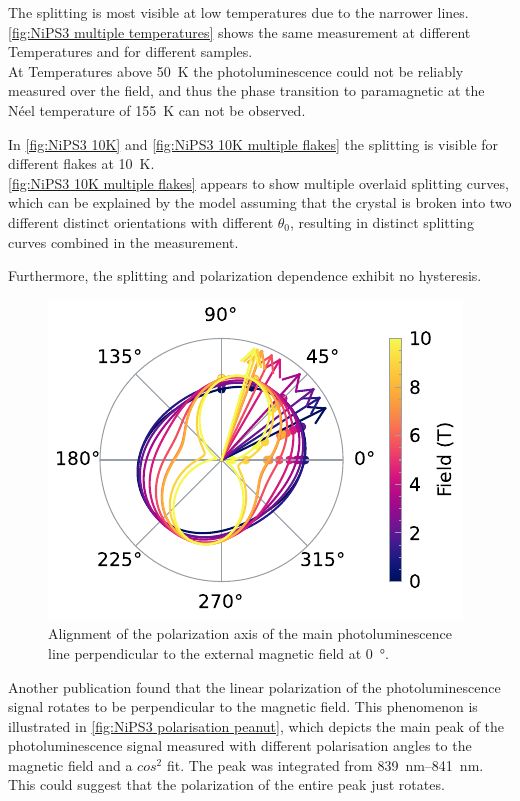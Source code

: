 \documentclass[
	oneside,
	parskip=half,
	a4paper,
]{scrbook}
\begin{document}
The splitting is most visible at low temperatures due to the narrower lines.
\autoref{fig:NiPS3 multiple temperatures} shows the same measurement at different Temperatures and for different samples.\\
At Temperatures above \SI{50}{K} the photoluminescence could not be reliably measured over the field, and thus the phase transition to paramagnetic at the Néel temperature of \SI{155}{K} \cite{MPS_magnetism} can not be observed.

In \autoref{fig:NiPS3 10K} and \autoref{fig:NiPS3 10K multiple flakes} the splitting is visible for different flakes at \SI{10}{K}.\\
\autoref{fig:NiPS3 10K multiple flakes} appears to show multiple overlaid splitting curves,
which can be explained by the model assuming that the crystal is broken into two different distinct orientations with different $\theta_0$, resulting in distinct splitting curves combined in the measurement.

Furthermore, the splitting and polarization dependence exhibit no hysteresis.


\begin{figure}
	\centering
	\includegraphics{../figures/2024-04-07 NiPS3 polarisation.pdf}
	\caption{Alignment of the polarization axis of the main photoluminescence line perpendicular to the external magnetic field at \SI{0}{\degree}.}
	\label{fig:NiPS3 polarisation peanut}
\end{figure}
Another publication \cite{NiPS3_linear} found that the linear polarization of the photoluminescence signal rotates to be perpendicular to the magnetic field. 
This phenomenon is illustrated in \autoref{fig:NiPS3 polarisation peanut}, which depicts the main peak of the photoluminescence signal measured with different polarisation angles to the magnetic field and a $cos^2$ fit. The peak was integrated from \SIrange{839}{841}{nm}.\\
This could suggest that the polarization of the entire peak just rotates.
\end{document}
